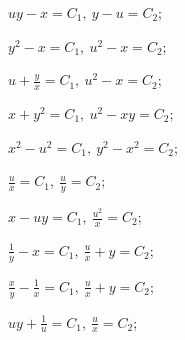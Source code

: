\begin{enumsols}
		\label{sol:nonlinsys_systodes:symmetrical2}
		\item \( uy - x = C_1, ~ y - u = C_2 \); \sfill %
		\item \( y^2 - x = C_1, ~ u^2 - x = C_2 \); \sfill %
		\item \( u + \frac{y}{x} = C_1, ~ u^2 - x = C_2 \); \sfill %
		\item \( x + y^2 = C_1, ~ u^2 - xy = C_2 \); \sfill %
		\item \( x^2 - u^2 = C_1, ~ y^2 - x^2 = C_2 \); \sfill %
		\item \( \frac{u}{x} = C_1, ~ \frac{u}{y} = C_2 \); \sfill %
		\item \( x - uy = C_1, ~ \frac{u^2}{x} = C_2 \); \sfill %
		\item \( \frac{1}{y} - x = C_1, ~ \frac{u}{x} + y = C_2 \); \sfill %
		\item \( \frac{x}{y} - \frac{1}{x} = C_1, ~ \frac{u}{x} + y = C_2 \); \sfill %
		\item \( uy + \frac{1}{u} = C_1, ~ \frac{u}{x} = C_2 \); \sfill %
		

\end{enumsols}
